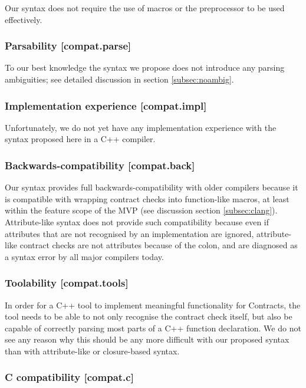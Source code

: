 Our syntax does not require the use of macros or the preprocessor to be used effectively.

\subsubsection{Parsability  [compat.parse]}

To our best knowledge the syntax we propose does not introduce any parsing ambiguities; see detailed discussion in section \ref{subsec:noambig}.

\subsubsection{Implementation experience  [compat.impl]}

Unfortunately, we do not yet have any implementation experience with the syntax proposed here in a C++ compiler.

\subsubsection{Backwards-compatibility  [compat.back]}

Our syntax provides full backwards-compatibility with older compilers because it is compatible with wrapping contract checks into function-like macros, at least within the feature scope of the MVP (see discussion section \ref{subsec:clang}). Attribute-like syntax does not provide such compatibility because even if attributes that are not recognised by an implementation are ignored, attribute-like contract checks are not attributes because of the colon, and are diagnosed as a syntax error by all major compilers today.

\subsubsection{Toolability [compat.tools]}

In order for a C++ tool to implement meaningful functionality for Contracts, the tool needs to be able to not only recognise the contract check itself, but also be capable of correctly parsing most parts of a C++ function declaration. We do not see any reason why this should be any more difficult with our proposed syntax than with attribute-like or closure-based syntax.

\subsubsection{C compatibility  [compat.c]}

